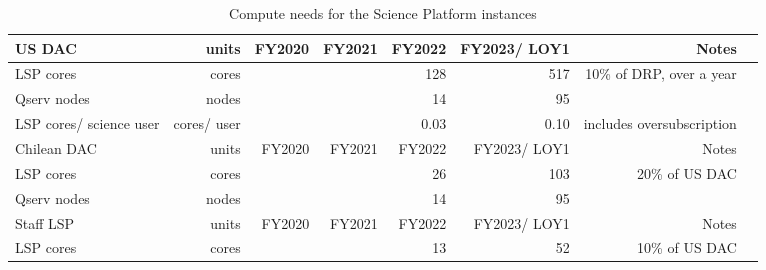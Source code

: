 \tiny \begin{longtable} { |p{}  |r  |r  |r  |r  |r  |r  |r |} 
\caption{Compute needs for the Science Platform instances \label{tab:lspSizing}}\\ 
\hline 
\textbf{US DAC}&\textbf{units}&\textbf{FY2020}&\textbf{FY2021}&\textbf{FY2022}&\textbf{FY2023/ LOY1}&\textbf{Notes} \\ \hline
{LSP cores}&{cores}&{}&{}&{128}&{517}&{10\% of DRP, over a year} \\ \hline
{Qserv nodes}&{nodes}&{}&{}&{14}&{95}& \\ \hline
{LSP cores/ science user}&{cores/ user}&{}&{}&{0.03}&{0.10}&{includes oversubscription} \\ \hline
{Chilean DAC}&{units}&{FY2020}&{FY2021}&{FY2022}&{FY2023/ LOY1}&{Notes} \\ \hline
{LSP cores}&{cores}&{}&{}&{26}&{103}&{20\% of US DAC} \\ \hline
{Qserv nodes}&{nodes}&{}&{}&{14}&{95}& \\ \hline
{Staff LSP}&{units}&{FY2020}&{FY2021}&{FY2022}&{FY2023/ LOY1}&{Notes} \\ \hline
{LSP cores}&{cores}&{}&{}&{13}&{52}&{10\% of US DAC} \\ \hline
\end{longtable} \normalsize
